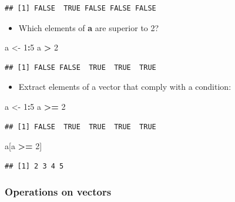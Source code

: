 \documentclass[]{book}
\newenvironment{Shaded}{\begin{snugshade}}{\end{snugshade}}
\newcommand{\DecValTok}[1]{\textcolor[rgb]{0.00,0.00,0.81}{#1}}
\newcommand{\NormalTok}[1]{#1}
\newcommand{\OperatorTok}[1]{\textcolor[rgb]{0.81,0.36,0.00}{\textbf{#1}}}
\newcommand{\StringTok}[1]{\textcolor[rgb]{0.31,0.60,0.02}{#1}}
\providecommand{\tightlist}{%
  \setlength{\itemsep}{0pt}\setlength{\parskip}{0pt}}
\begin{document}
\begin{verbatim}
## [1] FALSE  TRUE FALSE FALSE FALSE
\end{verbatim}

\begin{itemize}
\tightlist
\item
  Which elements of \textbf{a} are superior to 2?
\end{itemize}

\begin{Shaded}
\begin{Highlighting}[]
\NormalTok{a <-}\StringTok{ }\DecValTok{1}\OperatorTok{:}\DecValTok{5}
\NormalTok{a }\OperatorTok{>}\StringTok{ }\DecValTok{2}
\end{Highlighting}
\end{Shaded}

\begin{verbatim}
## [1] FALSE FALSE  TRUE  TRUE  TRUE
\end{verbatim}

\begin{itemize}
\tightlist
\item
  Extract elements of a vector that comply with a condition:
\end{itemize}

\begin{Shaded}
\begin{Highlighting}[]
\NormalTok{a <-}\StringTok{ }\DecValTok{1}\OperatorTok{:}\DecValTok{5}
\NormalTok{a }\OperatorTok{>=}\StringTok{ }\DecValTok{2}
\end{Highlighting}
\end{Shaded}

\begin{verbatim}
## [1] FALSE  TRUE  TRUE  TRUE  TRUE
\end{verbatim}

\begin{Shaded}
\begin{Highlighting}[]
\NormalTok{a[a }\OperatorTok{>=}\StringTok{ }\DecValTok{2}\NormalTok{]}
\end{Highlighting}
\end{Shaded}

\begin{verbatim}
## [1] 2 3 4 5
\end{verbatim}

\hypertarget{operations-on-vectors}{%
\subsubsection{Operations on vectors}\label{operations-on-vectors}}
\end{document}
